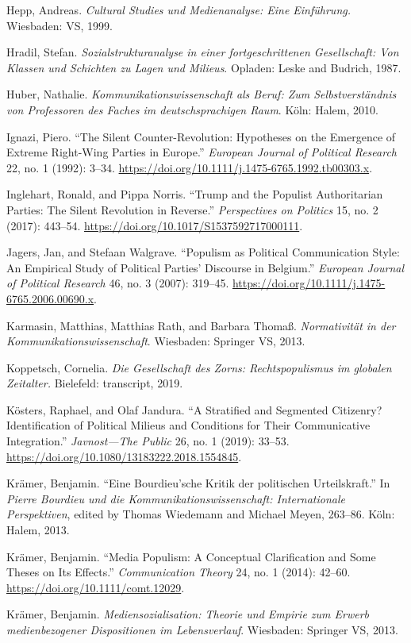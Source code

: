 \documentclass{tufte-handout}
\begin{document}
\begin{hangparas}{.25in}{1}
Hepp, Andreas. \emph{Cultural Studies und Medienanalyse: Eine
Einführung.} Wiesbaden: VS, 1999.

Hradil, Stefan. \emph{Sozialstrukturanalyse in einer fortgeschrittenen
Gesellschaft: Von Klassen und Schichten zu Lagen und Milieus}. Opladen:
Leske and Budrich, 1987.

Huber, Nathalie. \emph{Kommunikationswissenschaft als Beruf: Zum
Selbstverständnis von Professoren des Faches im deutschsprachigen Raum}.
Köln: Halem, 2010.

Ignazi, Piero. ``The Silent Counter-Revolution: Hypotheses on the
Emergence of Extreme Right-Wing Parties in Europe.'' \emph{European
Journal of Political Research} 22, no. 1 (1992): 3--34.
\url{https://doi.org/10.1111/j.1475-6765.1992.tb00303.x}.

Inglehart, Ronald, and Pippa Norris. ``Trump and the Populist
Authoritarian Parties: The Silent Revolution in Reverse.''
\emph{Perspectives on Politics} 15, no. 2 (2017): 443--54.
\url{https://doi.org/10.1017/S1537592717000111}.

Jagers, Jan, and Stefaan Walgrave. ``Populism as Political Communication
Style: An Empirical Study of Political Parties' Discourse in Belgium.''
\emph{European Journal of Political Research} 46, no. 3 (2007): 319--45.
\url{https://doi.org/10.1111/j.1475-6765.2006.00690.x}.

Karmasin, Matthias, Matthias Rath, and Barbara Thomaß.
\emph{Normativität in der Kommunikationswissenschaft}. Wiesbaden:
Springer VS, 2013.

Koppetsch, Cornelia. \emph{Die Gesellschaft des Zorns: Rechtspopulismus
im globalen Zeitalter.} Bielefeld: transcript, 2019.

Kösters, Raphael, and Olaf Jandura. ``A Stratified and Segmented
Citizenry? Identification of Political Milieus and Conditions for Their
Communicative Integration.'' \emph{Javnost---The Public} 26, no. 1
(2019): 33--53. \url{https://doi.org/10.1080/13183222.2018.1554845}.

Krämer, Benjamin. ``Eine Bourdieu'sche Kritik der politischen
Urteilskraft.'' In \emph{Pierre Bourdieu und die
Kommunikationswissenschaft: Internationale Perspektiven}, edited by
Thomas Wiedemann and Michael Meyen, 263--86. Köln: Halem, 2013.

Krämer, Benjamin. ``Media Populism: A Conceptual Clarification and Some
Theses on Its Effects.'' \emph{Communication Theory} 24, no. 1 (2014):
42--60. \url{https://doi.org/10.1111/comt.12029}.

Krämer, Benjamin. \emph{Mediensozialisation: Theorie und Empirie zum
Erwerb medienbezogener Dispositionen im Lebensverlauf}. Wiesbaden:
Springer VS, 2013.


\end{hangparas}
\end{document}
